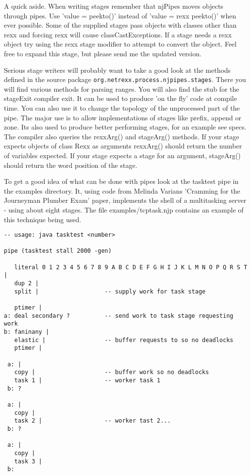 A quick aside.  When writing stages remember that njPipes moves objects through pipes.  Use 'value = peekto()' instead of 'value = rexx peekto()' when ever possible.  Some of the supplied stages pass objects with classes other than rexx and forcing rexx will cause classCastExceptions. If a stage needs a rexx object try using the rexx stage modifier to attempt to convert the object.  Feel free to expand this stage, but please send me the updated version.

Serious stage writers will probably want to take a good look at the
methods defined in the \nr{} source package \texttt{org.netrexx.process.njpipes.stages}.  There you will find various methods for parsing ranges.  You will also find the stub for the stageExit compiler exit.  It can be used to produce 'on the fly' code at compile time.  You can also use it to change the topology of the unprocessed part of the pipe.  The major use is to allow implementations of stages like prefix, append or zone.  Its also used to produce better performing stages, for an example see specs.
The compiler also queries the rexxArg() and stageArg() methods.  If your stage expects objects of class Rexx as arguments rexxArg() should return the number of variables expected.  If your stage expects a stage for an argument, stageArg() should return the word position of the stage.

To get a good idea of what can be done with pipes look at the tasktest
pipe in the examples directory.  It, using code from Melinda Varians
'Cramming for the Journeyman Plumber Exam' paper,  implements the
shell of a  multitasking server - using about eight stages.  The file
examples/tcptask.njp contains an example of this technique being used.
\begin{lstlisting}
-- usage: java tasktest <number>

pipe (tasktest stall 2000 -gen)

   literal 0 1 2 3 4 5 6 7 8 9 A B C D E F G H I J K L M N O P Q R S T |
   dup 2 |
   split |                   -- supply work for task stage

   ptimer |
a: deal secondary ?          -- send work to task stage requesting work
b: faninany |
   elastic |                 -- buffer requests to so no deadlocks
   ptimer |

 a: |
   copy |                    -- buffer work so no deadlocks
   task 1 |                  -- worker task 1
 b: ?

 a: |
   copy |
   task 2 |                  -- worker tast 2...
 b: ?

 a: |
   copy |
   task 3 |
 b:
\end{lstlisting}

